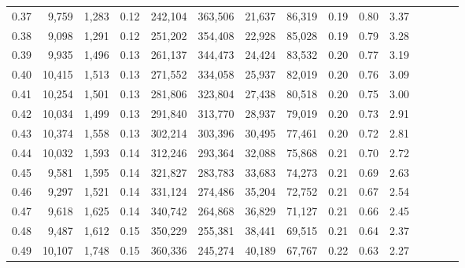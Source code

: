 \begin{tabular}{rrrcrrrrrrrrrrr}
0.37 &   9,759 &  1,283 &                                       0.12 &  242,104 &  363,506 &   21,637 &   86,319 &  0.19 &  0.80 &                         3.37 \\
0.38 &   9,098 &  1,291 &                                       0.12 &  251,202 &  354,408 &   22,928 &   85,028 &  0.19 &  0.79 &                         3.28 \\
0.39 &   9,935 &  1,496 &                                       0.13 &  261,137 &  344,473 &   24,424 &   83,532 &  0.20 &  0.77 &                         3.19 \\
0.40 &  10,415 &  1,513 &                                       0.13 &  271,552 &  334,058 &   25,937 &   82,019 &  0.20 &  0.76 &                         3.09 \\
0.41 &  10,254 &  1,501 &                                       0.13 &  281,806 &  323,804 &   27,438 &   80,518 &  0.20 &  0.75 &                         3.00 \\
0.42 &  10,034 &  1,499 &                                       0.13 &  291,840 &  313,770 &   28,937 &   79,019 &  0.20 &  0.73 &                         2.91 \\
0.43 &  10,374 &  1,558 &                                       0.13 &  302,214 &  303,396 &   30,495 &   77,461 &  0.20 &  0.72 &                         2.81 \\
0.44 &  10,032 &  1,593 &                                       0.14 &  312,246 &  293,364 &   32,088 &   75,868 &  0.21 &  0.70 &                         2.72 \\
0.45 &   9,581 &  1,595 &                                       0.14 &  321,827 &  283,783 &   33,683 &   74,273 &  0.21 &  0.69 &                         2.63 \\
0.46 &   9,297 &  1,521 &                                       0.14 &  331,124 &  274,486 &   35,204 &   72,752 &  0.21 &  0.67 &                         2.54 \\
0.47 &   9,618 &  1,625 &                                       0.14 &  340,742 &  264,868 &   36,829 &   71,127 &  0.21 &  0.66 &                         2.45 \\
0.48 &   9,487 &  1,612 &                                       0.15 &  350,229 &  255,381 &   38,441 &   69,515 &  0.21 &  0.64 &                         2.37 \\
0.49 &  10,107 &  1,748 &                                       0.15 &  360,336 &  245,274 &   40,189 &   67,767 &  0.22 &  0.63 &                         2.27 \\

\end{tabular}
